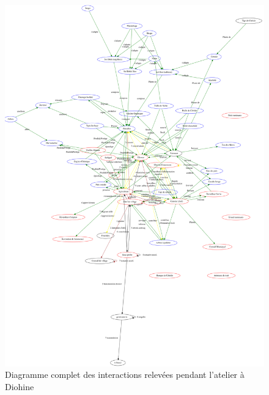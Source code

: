 \begin{figure}
  \begin{center}
  \includegraphics[width=15cm]{img/pardi_fdp.png}
  \end{center}
  \caption{Diagramme complet des interactions relevées pendant l'atelier à Diohine }
  \label{diagComplet}
\end{figure}
